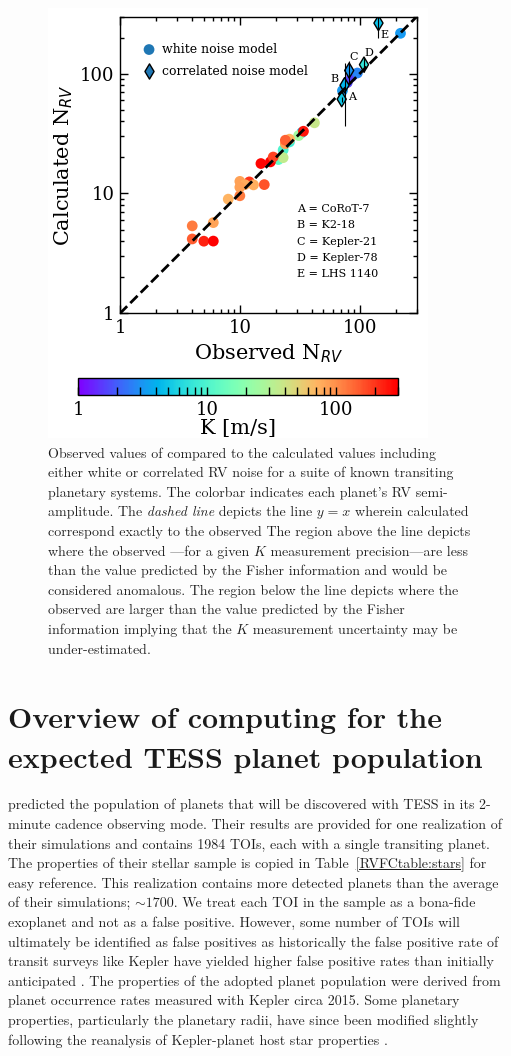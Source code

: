 \begin{figure}
  \centering
  \includegraphics[width=0.6\hsize]{figures/Nrvcomparison.png}
  \caption[Observed \nrv{} versus expected \nrv{} as calculated using our formalism.]
      {\small Observed values of \nrv{} compared to the calculated 
    values including either white or correlated RV noise for a suite of known transiting planetary systems.
    The colorbar indicates each planet's RV semi-amplitude. The \emph{dashed line}
    depicts the line $y=x$ wherein calculated \nrv{} correspond exactly to the observed  The region
    above the line depicts where the observed \nrv{}---for a given $K$ measurement
    precision---are less than the value predicted by the Fisher information and would be considered anomalous.
    The region below the line depicts where the observed \nrv{} are larger than the value predicted by the
    Fisher information implying that the $K$ measurement uncertainty may be under-estimated.}
  \label{RVFCfig:compare}
\end{figure}

\section{Overview of computing \nrv{} for the expected TESS planet population} \label{RVFCsect:simulation}
 predicted the population of planets that will be discovered with TESS in its
2-minute cadence observing mode. Their results are provided for one realization of their simulations
and contains 1984 TOIs, each with a single transiting planet. The properties of their stellar sample
is copied in Table~\ref{RVFCtable:stars} for easy reference. This realization contains more detected
planets than the average of their simulations; $\sim 1700$. We treat each TOI in the 
sample as a bona-fide exoplanet and not as a false positive. However, some number of TOIs will ultimately
be identified as false positives as historically the false positive rate of transit surveys like Kepler
have yielded higher false positive rates than initially anticipated \citep{sliski14,morton16}.
The properties of the adopted planet population
were derived from planet occurrence rates measured with Kepler circa 2015. Some planetary properties,
particularly the planetary radii, have since been modified slightly following
the reanalysis of Kepler-planet host star properties \citep[e.g.][]{fulton17}.

